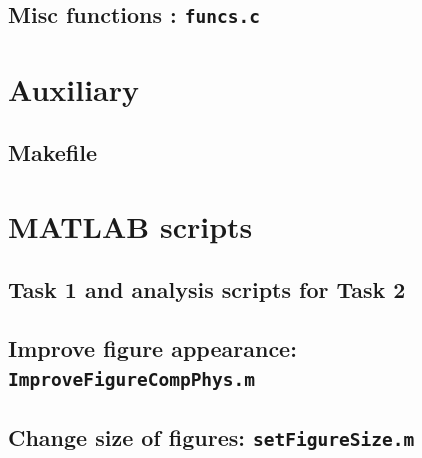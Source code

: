 \subsection{Misc functions : \texttt{funcs.c}}


\section{Auxiliary }
\subsection{Makefile}


\section{MATLAB scripts}
\subsection{Task 1 and analysis scripts for Task 2}


\subsection{Improve figure appearance: \texttt{ImproveFigureCompPhys.m}}


\subsection{Change size of figures: \texttt{setFigureSize.m}}




